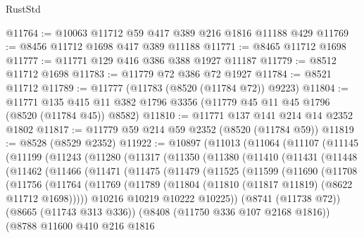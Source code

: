 \begin{lexlean}{RustStd}
\begin{coremodule}
@11764 := @10063 @11712 @59 @417 @389 @216 @1816 @11188 @429
@11769 := @8456 @11712 @1698 @417 @389 @11188
@11771 := @8465 @11712 @1698
@11777 := @11771 @129 @416 @386 @388 @1927 @11187
@11779 := @8512 @11712 @1698
@11783 := @11779 @72 @386 @72 @1927
@11784 := @8521 @11712
@11789 := @11777 (@11783 (@8520 (@11784 @72)) @9223)
@11804 := @11771
    @135
    @415
    @11
    @382
    @1796
    @3356
    (@11779 @45 @11 @45 @1796 (@8520 (@11784 @45)) @8582)
@11810 := @11771 @137 @141 @214 @14 @2352 @1802
@11817 := @11779 @59 @214 @59 @2352 (@8520 (@11784 @59))
@11819 := @8528 (@8529 @2352)
@11922 := @10897
    (@11013
      (@11064
        (@11107
          (@11145
            (@11199
              (@11243
                (@11280
                  (@11317
                    (@11350
                      (@11380
                        (@11410
                          (@11431
                            (@11448
                              (@11462
                                (@11466
                                  (@11471
                                    (@11475
                                      (@11479
                                        (@11525
                                          (@11599
                                            (@11690
                                              (@11708
                                                (@11756
                                                  (@11764
                                                    (@11769
                                                      (@11789
                                                        (@11804
                                                          (@11810
                                                            (@11817 @11819)
                                                            (@8622 @11712 @1698)))))
                                                    @10216
                                                    @10219
                                                    @10222
                                                    @10225))
                                                (@8741 (@11738 @72))
                                                (@8665 (@11743 @313 @336))
                                                (@8408 (@11750 @336 @107 @2168 @1816))
                                                (@8788
                                                  @11600
                                                  @410
                                                  @216
                                                  @1816

\end{coremodule}
\end{lexlean}
